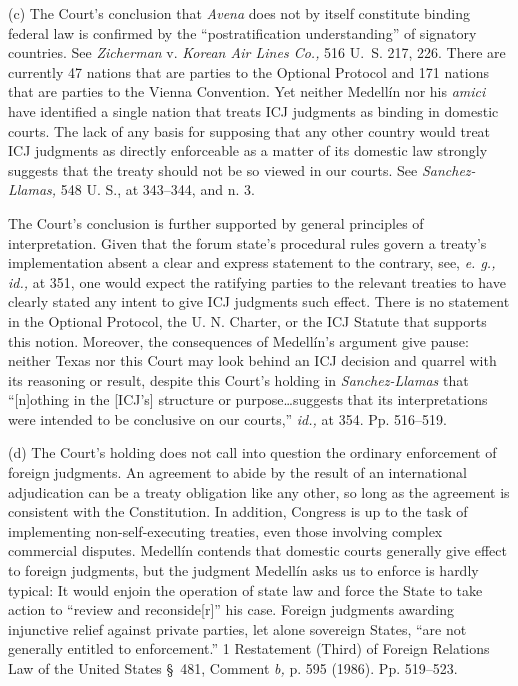   (c) The Court's conclusion that \emph{Avena} does not by itself
constitute binding federal law is confirmed by the ``postratification
understanding'' of signatory countries. See \emph{Zicherman} v.
\emph{Korean Air Lines Co.,} 516 U.~S. 217, 226. There are currently 47
nations that are parties to the Optional Protocol and 171 nations that
are parties to the Vienna Convention. Yet neither Medellín nor his
\emph{amici} have identified a single nation that treats ICJ judgments as
binding in domestic courts. The lack of any basis for supposing that
any other country would treat ICJ judgments as directly enforceable as
a matter of its domestic law strongly suggests that the treaty should
not be so viewed in our courts. See \emph{Sanchez-Llamas,} 548 U. S., at
343--344, and n. 3.

  The Court's conclusion is further supported by general principles of
interpretation. Given that the forum state's procedural rules govern
a treaty's implementation absent a clear and express statement to
the contrary, see, \emph{e. g., id.,} at 351, one would expect the
ratifying parties to the relevant treaties to have clearly stated any
intent to give ICJ judgments such effect. There is no statement in the
Optional Protocol, the U. N. Charter, or the ICJ Statute that supports
this notion. Moreover, the consequences of Medellín's argument give
pause: neither Texas nor this Court may look behind an ICJ decision and
quarrel with its reasoning or result, despite this Court's holding
in \emph{Sanchez-Llamas} that ``[n]othing in the [ICJ's] structure or
purpose\dots suggests that its interpretations were intended to be
conclusive on our courts,'' \emph{id.,} at 354. Pp. 516--519.

  (d) The Court's holding does not call into question the ordinary
enforcement of foreign judgments. An agreement to abide by the result
of an international adjudication can be a treaty obligation like any
other, so long as the agreement is consistent with the Constitution. In
addition, Congress is up to the task of implementing non-self-executing
treaties, even those involving complex commercial disputes. Medellín
contends that domestic courts generally give effect to foreign
judgments, but the judgment Medellín asks us to enforce is hardly
typical: It would enjoin the operation of state law and force the State
to take action to ``review and reconside[r]'' his case. Foreign
judgments awarding injunctive relief against private parties, let alone
sovereign States, ``are not generally entitled to enforcement.''
1 Restatement (Third) of Foreign Relations Law of the United States
\S~481, Comment \emph{b,} p. 595 (1986). Pp. 519--523.

